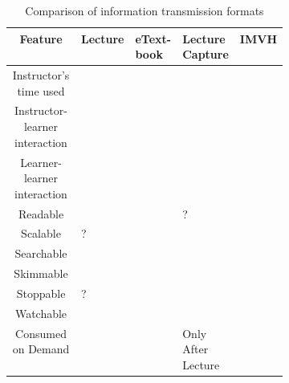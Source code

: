 \documentclass[12pt]{article}
\begin{document}

\begin{table}
	\caption{Comparison of information transmission formats} \label{tech_comparison}
	\centering
	\begin{tabular}{|c*{4}{|>{\centering\arraybackslash}m{0.1\linewidth}}|}
		\hline
		Feature & Lecture & eText-book & Lecture Capture & IMVH\\
		\hline
		Instructor's time used & \checkmark & & &\\
		Instructor-learner interaction & \checkmark & & &\\
		Learner-learner interaction & \checkmark & & & \\
		Readable & & \checkmark & ? & \checkmark \\
		Scalable & ? & \checkmark & \checkmark & \checkmark \\
		Searchable & & \checkmark & & \checkmark \\
		Skimmable & & \checkmark & & \checkmark \\
		Stoppable & ? & \checkmark & \checkmark & \checkmark \\
		Watchable & \checkmark & & \checkmark & \checkmark \\
		Consumed on Demand & & \checkmark & Only After Lecture &\checkmark \\
		\hline

	\end{tabular}
	\label{infotransmission}
\end{table}
\end{document}
